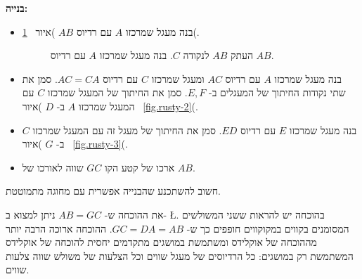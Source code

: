 \documentclass[12pt,a4paper]{article}
\begin{document}
\textbf{בנייה:}
\vspace*{-2ex}
\begin{itemize}
\item
בנה מעגל שמרכזו 
$A$
עם רדיוס
$AB$
)איור~
\ref{fig.rusty-1}(.

\begin{figure}[H]
\begin{center}
\caption{%
העתק
$AB$
לנקודה
$C$.
בנה מעגל שמרכזו
$A$
עם רדיוס
$AB$.%
}\label{fig.rusty-1}
\end{center}
\end{figure}
\vspace*{-8ex}
\item
בנה מעגל שמרכזו
$A$
עם רדיוס
$AC$
ומעגל שמרכזו
$C$
עם רדיוס
$AC=CA$.
סמן את שתי נקודות החיתוך של המעגלים ב-%
$E,F$.
סמן את החיתוך של המעגל שמרכזו
$C$
עם המעגל שמרכזו
$A$
ב-%
$D$
)איור~%
\ref{fig.rusty-2}(.
\item
בנה מעגל שמרכזו 
$E$
עם רדיוס 
$ED$.
סמן את החיתוך של מעגל זה עם המעגל שמרכזו
$C$
ב-%
$G$
)איור~%
\ref{fig.rusty-3}(.
\item
ארכו של קטע הקו 
$GC$
שווה לאורכו של
$AB$.
\end{itemize}
חשוב להשתכנע שהבנייה אפשרית עם מחוגה מתמוטטת.

את ההוכחה ש-%
$AB=GC$
ניתן למצוא ב-%
\L{\cite{rusty}}.
בהוכחה יש להראות ששני המשולשים המסומנים בקווים במקוקווים חופפים כך ש-%
$GC=DA=AB$.
ההוכחה ארוכה הרבה יותר מההוכחה של אוקלידס ומשתמשת במושגים מתקדמים יחסית להוכחה של אוקלידס המשתמשת רק במושגים: כל הרדיוסים של מעגל שווים וכל הצלעות של משולש שווה צלעות שווים.
\end{document}
